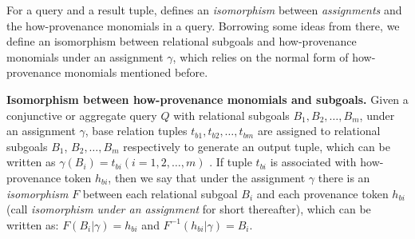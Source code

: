 
For a query and a result tuple, \cite{amsterdamer2012provenance} defines an \textit{isomorphism} between {\em assignments} and the how-provenance monomials in a query. Borrowing some ideas from there, we define an isomorphism between relational subgoals and how-provenance monomials under an assignment $\gamma$, which relies on the normal form of how-provenance monomials mentioned before.

\begin{definition}
{\bf Isomorphism between how-provenance monomials and subgoals.}  Given a conjunctive or aggregate query $Q$ with relational subgoals $B_1, B_2, \dots, B_m$,
\eat{\begin{tabbing}
\noindent
{\tt $Q(X_1, X_2,\dots, X_t) :- B_1, B_2, \dots, B_m, condition(Q)$}
\end{tabbing}}
under an assignment $\gamma$, base relation tuples $t_{b1}, t_{b2}, \dots, t_{bm}$ are assigned to relational subgoals $B_1$, $B_2, \dots, B_m$ respectively to generate an output tuple, which can be written as $\gamma(B_i) = t_{bi} (i=1,2,\dots, m)$ \cite{amsterdamer2011provenance}. If tuple $t_{bi}$ is associated with how-provenance token $h_{bi}$, then we say that under the assignment $\gamma$ there is an {\em isomorphism} $F$ between each relational subgoal $B_i$ and each provenance token $h_{bi}$ (call {\em isomorphism under an assignment} for short thereafter), which can be written as: $F(B_i|\gamma) = h_{bi}$ and $F^{-1}(h_{bi}|\gamma) = B_i$.
\end{definition}

